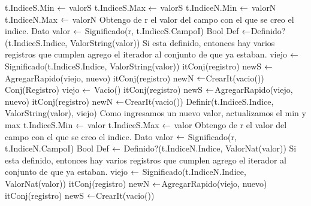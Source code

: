 {				\EndIf
			\EndIf
		\EndIf
		 
			\State t.IndiceS.Min $\leftarrow$ valorS
		\EndIf
			\State t.IndiceS.Max $\leftarrow$ valorS
		\EndIf	
		 
			\State t.IndiceN.Min $\leftarrow$ valorN
		\EndIf
			\State t.IndiceN.Max $\leftarrow$ valorN
		\EndIf	
	\Else
			\State Obtengo de r el valor del campo con el que se creo el indice.
			\State Dato valor	$\leftarrow$	Significado(r, t.IndiceS.CampoI) 
			\State Bool Def $\leftarrow$Definido?(t.IndiceS.Indice, ValorString(valor))
			 
				\State	Si esta definido, entonces hay varios registros que cumplen
				\State	agrego el iterador al conjunto de que ya estaban.
				\State viejo $\leftarrow$ Significado(t.IndiceS.Indice, ValorString(valor))
				\State itConj(registro) newS $\leftarrow$AgregarRapido(viejo, nuevo) 
				\State itConj(registro) newN $\leftarrow$CrearIt(vacio())
			\Else
				\State Conj(Registro) viejo $\leftarrow$ Vacio() 
				\State itConj(registro) newS $\leftarrow$AgregarRapido(viejo, nuevo)
				\State itConj(registro) newN $\leftarrow$CrearIt(vacio())
				\State Definir(t.IndiceS.Indice, ValorString(valor), viejo) 
				\State Como ingresamos un nuevo valor, actualizamos el min y max
				 
					\State t.IndiceS.Min $\leftarrow$ valor
				\EndIf
					\State t.IndiceS.Max $\leftarrow$ valor
				\EndIf
			\EndIf			
		\Else
				\State Obtengo de r el valor del campo con el que se creo el indice.
				\State Dato valor $\leftarrow$ Significado(r, t.IndiceN.CampoI) 
				\State Bool Def $\leftarrow$ Definido?(t.IndiceN.Indice, ValorNat(valor))
				 
					\State	Si esta definido, entonces hay varios registros que cumplen
					\State	agrego el iterador al conjunto de que ya estaban.
					\State viejo $\leftarrow$ Significado(t.IndiceN.Indice, ValorNat(valor))
					\State itConj(registro) newN $\leftarrow$AgregarRapido(viejo, nuevo) 
					\State itConj(registro) newS $\leftarrow$CrearIt(vacio())
}
